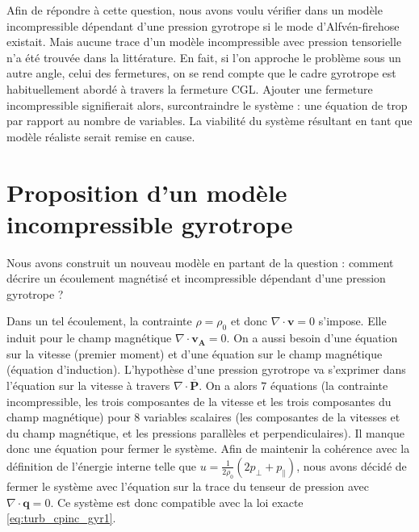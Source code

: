 Afin de répondre à cette question, nous avons voulu vérifier dans un modèle incompressible dépendant d'une pression gyrotrope si le mode d'Alfvén-firehose existait. Mais aucune trace d'un modèle incompressible avec pression tensorielle n'a été trouvée dans la littérature. En fait, si l'on approche le problème sous un autre angle, celui des fermetures, on se rend compte que le cadre gyrotrope est habituellement abordé à travers la fermeture \ac{CGL}. Ajouter une fermeture incompressible signifierait alors, surcontraindre le système : une équation de trop par rapport au nombre de variables. La viabilité du système résultant en tant que modèle réaliste serait remise en cause. %

\section{Proposition d'un modèle incompressible gyrotrope}
\label{sec-222}

Nous avons construit un nouveau modèle en partant de la question : comment décrire un écoulement magnétisé et incompressible dépendant d'une pression gyrotrope ? 

Dans un tel écoulement, la contrainte  $\rho = \rho_0$ et donc $\nabla \cdot \boldsymbol{v}=0$ s'impose. Elle induit pour le champ magnétique $\nabla \cdot \boldsymbol{v_A} = 0$. On a aussi besoin d'une équation sur la vitesse (premier moment) et d'une équation sur le champ magnétique (équation d'induction). L'hypothèse d'une pression gyrotrope va s'exprimer dans l'équation sur la vitesse à travers $\nabla \cdot \overline{\boldsymbol{P}}$. On a alors $\num{7}$ équations (la contrainte incompressible, les trois composantes de la vitesse et les trois composantes du champ magnétique) pour $\num{8}$ variables scalaires (les composantes de la vitesses et du champ magnétique, et les pressions parallèles et perpendiculaires). Il manque donc une équation pour fermer le système. Afin de maintenir la cohérence avec la définition de l'énergie interne telle que $u = \frac{1}{2 \rho_0} (2p_{\perp} + p_{\parallel}) $, nous avons décidé de fermer le système avec l'équation sur la trace du tenseur de pression avec $\nabla \cdot \boldsymbol{q} = 0$. Ce système est donc compatible avec la loi exacte \eqref{eq:turb_cpinc_gyr1}.

